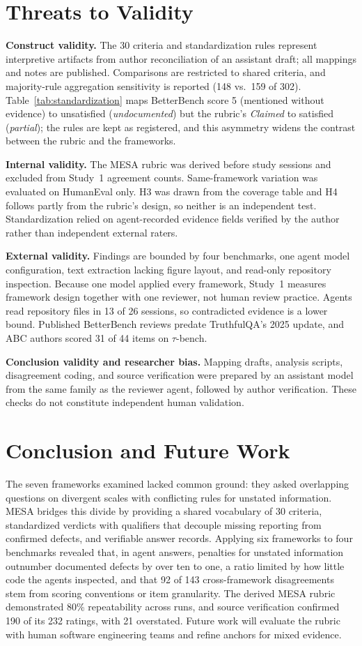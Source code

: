 \documentclass[10pt,conference]{IEEEtran}
\begin{document}
\section{Threats to Validity}
\textbf{Construct validity.} The 30 criteria and standardization rules represent interpretive artifacts from author reconciliation of an assistant draft; all mappings and notes are published. Comparisons are restricted to shared criteria, and majority-rule aggregation sensitivity is reported (148 vs.\ 159 of 302). Table~\ref{tab:standardization} maps BetterBench score 5 (mentioned without evidence) to unsatisfied (\emph{undocumented}) but the rubric's \emph{Claimed} to satisfied (\emph{partial}); the rules are kept as registered, and this asymmetry widens the contrast between the rubric and the frameworks.

\textbf{Internal validity.} The MESA rubric was derived before study sessions and excluded from Study~1 agreement counts. Same-framework variation was evaluated on HumanEval only. H3 was drawn from the coverage table and H4 follows partly from the rubric's design, so neither is an independent test. Standardization relied on agent-recorded evidence fields verified by the author rather than independent external raters.

\textbf{External validity.} Findings are bounded by four benchmarks, one agent model configuration, text extraction lacking figure layout, and read-only repository inspection. Because one model applied every framework, Study~1 measures framework design together with one reviewer, not human review practice. Agents read repository files in 13 of 26 sessions, so contradicted evidence is a lower bound. Published BetterBench reviews predate TruthfulQA's 2025 update, and ABC authors scored 31 of 44 items on $\tau$-bench.

\textbf{Conclusion validity and researcher bias.} Mapping drafts, analysis scripts, disagreement coding, and source verification were prepared by an assistant model from the same family as the reviewer agent, followed by author verification. These checks do not constitute independent human validation.

\section{Conclusion and Future Work}
The seven frameworks examined lacked common ground: they asked overlapping questions on divergent scales with conflicting rules for unstated information. MESA bridges this divide by providing a shared vocabulary of 30 criteria, standardized verdicts with qualifiers that decouple missing reporting from confirmed defects, and verifiable answer records. Applying six frameworks to four benchmarks revealed that, in agent answers, penalties for unstated information outnumber documented defects by over ten to one, a ratio limited by how little code the agents inspected, and that 92 of 143 cross-framework disagreements stem from scoring conventions or item granularity. The derived MESA rubric demonstrated 80\% repeatability across runs, and source verification confirmed 190 of its 232 ratings, with 21 overstated. Future work will evaluate the rubric with human software engineering teams and refine anchors for mixed evidence.
\end{document}

